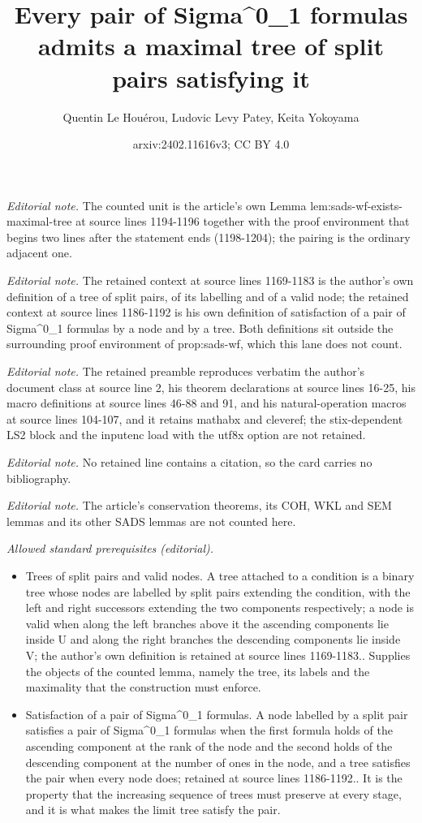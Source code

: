 \documentclass{article}
\title{Every pair of Sigma\textasciicircum{}0\_1 formulas admits a maximal tree of split pairs satisfying it}
\author{Quentin Le Houérou, Ludovic Levy Patey, Keita Yokoyama}
\date{arxiv:2402.11616v3; CC BY 4.0}
\numberwithin{theorem}{section}
\begin{document}
\maketitle
\noindent\textit{Editorial note.} The counted unit is the article's own Lemma lem:sads-wf-exists-maximal-tree at source lines 1194-1196 together with the proof environment that begins two lines after the statement ends (1198-1204); the pairing is the ordinary adjacent one.\par\medskip
\noindent\textit{Editorial note.} The retained context at source lines 1169-1183 is the author's own definition of a tree of split pairs, of its labelling and of a valid node; the retained context at source lines 1186-1192 is his own definition of satisfaction of a pair of Sigma\textasciicircum{}0\_1 formulas by a node and by a tree. Both definitions sit outside the surrounding proof environment of prop:sads-wf, which this lane does not count.\par\medskip
\noindent\textit{Editorial note.} The retained preamble reproduces verbatim the author's document class at source line 2, his theorem declarations at source lines 16-25, his macro definitions at source lines 46-88 and 91, and his natural-operation macros at source lines 104-107, and it retains mathabx and cleveref; the stix-dependent LS2 block and the inputenc load with the utf8x option are not retained.\par\medskip
\noindent\textit{Editorial note.} No retained line contains a citation, so the card carries no bibliography.\par\medskip
\noindent\textit{Editorial note.} The article's conservation theorems, its COH, WKL and SEM lemmas and its other SADS lemmas are not counted here.\par\medskip
\noindent\textit{Allowed standard prerequisites (editorial).}\begin{itemize}
\item Trees of split pairs and valid nodes. A tree attached to a condition is a binary tree whose nodes are labelled by split pairs extending the condition, with the left and right successors extending the two components respectively; a node is valid when along the left branches above it the ascending components lie inside U and along the right branches the descending components lie inside V; the author's own definition is retained at source lines 1169-1183.. Supplies the objects of the counted lemma, namely the tree, its labels and the maximality that the construction must enforce.
\item Satisfaction of a pair of Sigma\textasciicircum{}0\_1 formulas. A node labelled by a split pair satisfies a pair of Sigma\textasciicircum{}0\_1 formulas when the first formula holds of the ascending component at the rank of the node and the second holds of the descending component at the number of ones in the node, and a tree satisfies the pair when every node does; retained at source lines 1186-1192.. It is the property that the increasing sequence of trees must preserve at every stage, and it is what makes the limit tree satisfy the pair.
\end{itemize}\medskip
\end{document}
